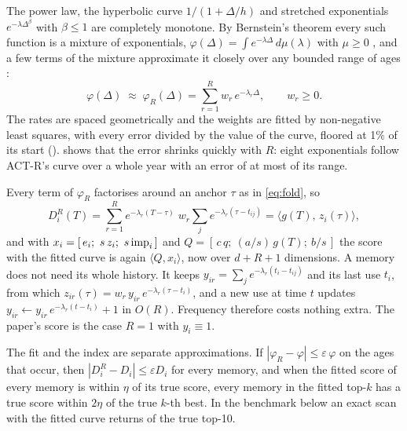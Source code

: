 The power law, the hyperbolic curve $1/(1+\Delta/h)$ and stretched exponentials $e^{-\lambda\Delta^\beta}$ with $\beta\le1$ are completely monotone. By Bernstein's theorem every such function is a mixture of exponentials, $\varphi(\Delta)=\int e^{-\lambda\Delta}\,d\mu(\lambda)$ with $\mu\ge0$ \citep{widder1941laplace}, and a few terms of the mixture approximate it closely over any bounded range of ages \citep{beylkin2005expsums}:
\begin{equation}
\varphi(\Delta)\;\approx\;\varphi_R(\Delta)=\sum_{r=1}^{R} w_r\,e^{-\lambda_r\Delta},\qquad w_r\ge0 .
\end{equation}
The rates are spaced geometrically and the weights are fitted by non-negative least squares, with every error divided by the value of the curve, floored at 1\% of its start ().  shows that the error shrinks quickly with $R$: eight exponentials follow ACT-R's curve over a whole year with an error of at most \CfActrRngEight{} of its range.

\begin{table}[t]
\centering\small

\caption{Largest error of a sum of $R$ exponentials over ages from 0 to one year, as a share of the curve's range and relative to the curve where it is above 1\% of its start. ACT-R: $(1+\Delta/1\,\mathrm{h})^{-0.5}$. Hyperbolic: $1/(1+\Delta/24\,\mathrm{h})$. FadeMem: $e^{-0.1\,t^{0.8}}$ with $t$ in days, the long-term setting of \citet{wei2026fademem}.}
\label{tab:curvefit}
\end{table}

Every term of $\varphi_R$ factorises around an anchor $\tau$ as in \cref{eq:fold}, so
\begin{equation}
D^R_i(T)=\sum_{r=1}^{R} e^{-\lambda_r(T-\tau)}\;w_r\sum_j e^{-\lambda_r(\tau-t_{ij})}=\langle g(T),\,z_i(\tau)\rangle ,
\end{equation}
and with $x_i=[\,e_i;\ s\,z_i;\ s\,\imp_i\,]$ and $Q=[\,c\,q;\ (a/s)\,g(T);\ b/s\,]$ the score with the fitted curve is again $\langle Q,x_i\rangle$, now over $d+R+1$ dimensions. A memory does not need its whole history. It keeps $y_{ir}=\sum_j e^{-\lambda_r(t_i-t_{ij})}$ and its last use $t_i$, from which $z_{ir}(\tau)=w_r\,y_{ir}\,e^{-\lambda_r(\tau-t_i)}$, and a new use at time $t$ updates $y_{ir}\leftarrow y_{ir}\,e^{-\lambda_r(t-t_i)}+1$ in $O(R)$. Frequency therefore costs nothing extra. The paper's score is the case $R=1$ with $y_i\equiv1$.

The fit and the index are separate approximations. If $|\varphi_R-\varphi|\le\varepsilon\,\varphi$ on the ages that occur, then $|D^R_i-D_i|\le\varepsilon D_i$ for every memory, and when the fitted score of every memory is within $\eta$ of its true score, every memory in the fitted top-$k$ has a true score within $2\eta$ of the true $k$-th best. In the benchmark below an exact scan with the fitted curve returns \CuFitRecallOneM{} of the true top-10.


